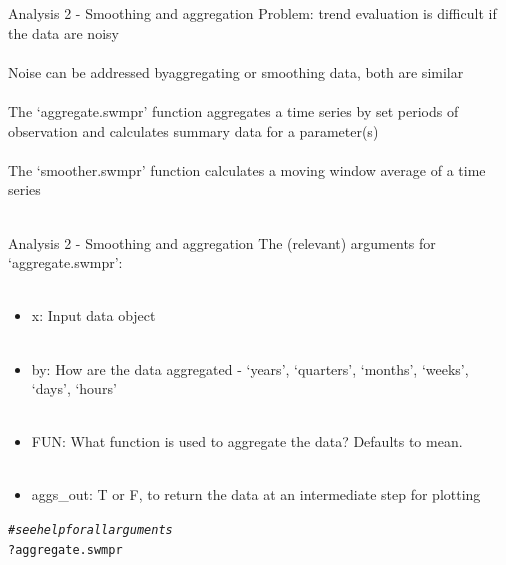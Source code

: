 \documentclass[xcolor=svgnames]{beamer}\usepackage[]{graphicx}\usepackage[]{color}
\makeatletter
\newcommand{\hlcom}[1]{\textcolor[rgb]{0.678,0.584,0.686}{\textit{#1}}}%
\newcommand{\hlopt}[1]{\textcolor[rgb]{0,0,0}{#1}}%
\newcommand{\hlstd}[1]{\textcolor[rgb]{0.345,0.345,0.345}{#1}}%
\newenvironment{kframe}{%
 \def\at@end@of@kframe{}%
 \ifinner\ifhmode%
  \def\at@end@of@kframe{\end{minipage}}%
  \begin{minipage}{\columnwidth}%
 \fi\fi%
 \def\FrameCommand##1{\hskip\@totalleftmargin \hskip-\fboxsep
 \colorbox{shadecolor}{##1}\hskip-\fboxsep
     \hskip-\linewidth \hskip-\@totalleftmargin \hskip\columnwidth}%
 \MakeFramed {\advance\hsize-\width
   \@totalleftmargin\z@ \linewidth\hsize
   \@setminipage}}%
 {\par\unskip\endMakeFramed%
 \at@end@of@kframe}
\newenvironment{knitrout}{}{} %
\makeatother
\begin{document}
\begin{frame}[containsverbatim]{Analysis 2 - Smoothing and aggregation}
\alert{Problem}: trend evaluation is difficult if the data are noisy \\~\\
Noise can be addressed by\alert{aggregating} or \alert{smoothing} data, both are similar \\~\\
The \alert{`aggregate.swmpr'} function aggregates a time series by set periods of observation and calculates summary data for a parameter(s) \\~\\
The \alert{`smoother.swmpr'} function calculates a moving window average of a time series \\~\\
\end{frame}

\begin{frame}[containsverbatim]{Analysis 2 - Smoothing and aggregation}
The (relevant) arguments for `aggregate.swmpr':\\~\\
\begin{itemize}
\item x: Input data object \\~\\
\item by: How are the data aggregated - `years', `quarters', `months', `weeks', `days', `hours' \\~\\
\item FUN: What function is used to aggregate the data? Defaults to mean.\\~\\
\item aggs\_out: T or F, to return the data at an intermediate step for plotting
\end{itemize}
\begin{knitrout}\scriptsize
{}\color{fgcolor}\begin{kframe}
\begin{alltt}
\hlcom{# see help for all arguments}
\hlopt{?}\hlstd{aggregate.swmpr}
\end{alltt}
\end{kframe}
\end{knitrout}
\end{frame}
\end{document}
